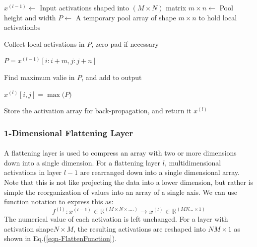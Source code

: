 \documentclass[12pt,letterpaper]{article}
\begin{document}
\begin{algorithm}[H]
\caption{Typical "Call" method for a 2-Dimensional Maximum Pooling layer in a neural network. We assume 2D input, but a practical implementation may include the need to loop over a high dimensional structure. For simplicity, we assume a stride size of $1 \times 1$. This example shows the computation over a single input $x^{(l-1)}$ but a practical implementation should include mini-batches of samples.}
\label{alg-CallPool2D}

\begin{algorithmic}
\REQUIRE $x^{(l-1)} \leftarrow$ Input activations shaped into $(M \times N)$ matrix
\REQUIRE $m \times n \leftarrow$ Pool height and width
\REQUIRE $P \leftarrow$ A temporary pool array of shape $m \times n $ to hold local activationbs

\FOR {$i \in [0,1,...,M-2,M-1$}
	\FOR {$j \in [0,1,...,N-2,N-1$}
		\item Collect local activations in $P$, zero pad if necessary
		\item $P = x^{(l-1)}[i:i+m,j:j+n]$
		\item Find maximum valie in $P$, and add to output
		\item $x^{(l)}[i,j] = \max\big( P \big)$
	\ENDFOR
\ENDFOR

Store the activation array for back-propagation, and return it
\RETURN $x^{(l)}$

\end{algorithmic}
\end{algorithm}


\subsubsection{1-Dimensional Flattening Layer}
\label{subsubsec-1DFlatten}

\paragraph*{}A flattening layer is used to compress an array with two or more dimensions down into a single dimension. For a flattening layer $l$, multidimensional activations in layer $l-1$ are rearranged down into a single dimensional array. Note that this is not like projecting the data into a lower dimension, but rather is simple the reorganization of values into an array of a single axis. We can use function notation to express this as:
\begin{equation}
\label{eqn-FlattenFunction}
f^{(l)} : x^{(l-1)} \in \mathbb{R}^{(M \times N \times ....)} \rightarrow
x^{(l)} \in \mathbb{R}^{(MN...\times 1)}
\end{equation}
The numerical value of each activation is left unchanged. For a layer with activation shape$N \times M$, the resulting activations are reshaped into $NM \times 1$ as shown in Eq.(\ref{eqn-FlattenFunction}).
\end{document}

